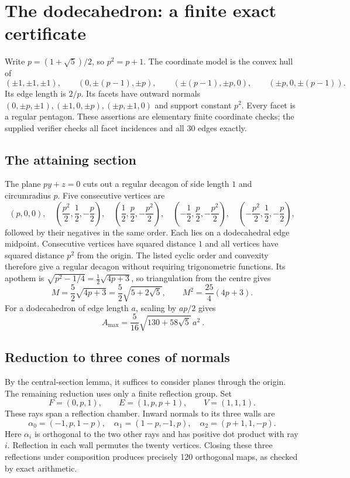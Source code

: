 \section{The dodecahedron: a finite exact certificate}
Write $p=(1+\sqrt5)/2$, so $p^2=p+1$.  The coordinate model is the convex
hull of
\[
 (\pm1,\pm1,\pm1),\qquad
 (0,\pm(p-1),\pm p),\qquad
 (\pm(p-1),\pm p,0),\qquad
 (\pm p,0,\pm(p-1)).
\]
Its edge length is $2/p$.  Its facets have outward normals
$(0,\pm p,\pm1),(\pm1,0,\pm p),(\pm p,\pm1,0)$ and support constant $p^2$.
Every facet is a regular pentagon.  These assertions are elementary finite
coordinate checks; the supplied verifier checks all facet incidences and all
30 edges exactly.

\subsection{The attaining section}
The plane $p y+z=0$ cuts out a regular decagon of side length $1$ and
circumradius $p$.  Five consecutive vertices are
\[
 (p,0,0),\quad
 \left(\frac{p^2}{2},\frac12,-\frac p2\right),\quad
 \left(\frac12,\frac p2,-\frac{p^2}{2}\right),\quad
 \left(-\frac12,\frac p2,-\frac{p^2}{2}\right),\quad
 \left(-\frac{p^2}{2},\frac12,-\frac p2\right),
\]
followed by their negatives in the same order.  Each lies on a dodecahedral
edge midpoint.  Consecutive vertices have squared distance $1$ and all
vertices have squared distance $p^2$ from the origin.  The listed cyclic
order and convexity therefore give a regular decagon without requiring
trigonometric functions.  Its apothem is
$\sqrt{p^2-1/4}=\frac12\sqrt{4p+3}$, so triangulation from the centre gives
\[
 M=\frac52\sqrt{4p+3}=\frac52\sqrt{5+2\sqrt5},
 \qquad M^2=\frac{25}{4}(4p+3).
\]
For a dodecahedron of edge length $a$, scaling by $ap/2$ gives
\[
 \boxed{\ A_{\max}=\frac{5}{16}\sqrt{130+58\sqrt5}\,a^2\ }.
\]

\subsection{Reduction to three cones of normals}
By the central-section lemma, it suffices to consider planes through the
origin.  The remaining reduction uses only a finite reflection group.
Set
\[
 F=(0,p,1),\qquad E=(1,p,p+1),\qquad V=(1,1,1).
\]
These rays span a reflection chamber.  Inward normals to its three walls are
\[
 \alpha_0=(-1,p,1-p),\quad
 \alpha_1=(1-p,-1,p),\quad
 \alpha_2=(p+1,1,-p).
\]
Here $\alpha_i$ is orthogonal to the two other rays and has positive dot
product with ray $i$.  Reflection in each wall permutes the twenty vertices.
Closing these three reflections under composition produces precisely
120 orthogonal maps, as checked by exact arithmetic.


